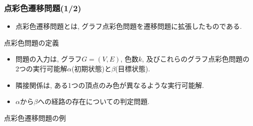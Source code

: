 \documentclass[dvipdfmx,11pt]{beamer}
\begin{document}

\begin{frame}\frametitle{点彩色遷移問題(1/2)}
  \begin{itemize}
    \item \alert{点彩色遷移問題}とは, グラフ点彩色問題を遷移問題に拡張したものである.
  \end{itemize}

  \begin{block}{点彩色問題の定義}
    \begin{itemize}
      \item 問題の入力は, グラフ$G=(V, E)$, 色数$k$, 及びこれらのグラフ点彩色問題の2つの実行可能解$\alpha$(初期状態)と$\beta$(目標状態).
      \item 隣接関係は, ある1つの頂点のみ色が異なるような実行可能解.
      \item $\alpha$から$\beta$への経路の存在についての判定問題.
    \end{itemize}
  \end{block}

  \begin{exampleblock}{点彩色遷移問題の例}
    \begin{columns}
      \begin{column}{0.45\textwidth}
        \centering
        
      \end{column}
      \begin{column}{0.45\textwidth}
        \centering
        
      \end{column}
    \end{columns}
  \end{exampleblock}
  
\end{frame}

\end{document}
